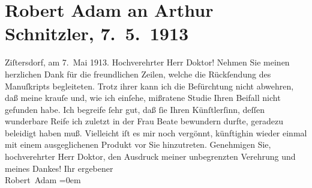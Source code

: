 

         \renewcommand{\erwaehnteOrte}{Orte: Wien, Zistersdorf}
         \renewcommand{\erwaehnteWerke}{Werke: Fatme, Frau Beate und ihr Sohn. Novelle}
               \section[Robert Adam an Arthur Schnitzler, 7. 5. 1913]{ Robert Adam an Arthur Schnitzler, 7. 5. 1913}\nopagebreak{}\rehead{ }\begin{ledgroupsized}[t]{13cm}\normalsize\beginnumbering \toendnotes[C]{\smallbreak\pagebreak[2]} 
\toendnotes[C]{\smallbreak}\pstart
           \raggedleft{}{\pb}Ziſtersdorf, am 7. Mai 1913.
                    \pend
           \pstart{}Hochverehrter Herr Doktor!\pend\pstart
           Nehmen Sie meinen herzlichen Dank für die freundlichen Zeilen, welche die
                    Rückſendung des Manuſkripts
                    begleiteten.\pend
           \pstart
           Trotz ihrer kann ich die Befürchtung nicht abwehren, daß meine krauſe und, wie
                    ich einſehe, mißratene Studie Ihren Beifall nicht gefunden habe. Ich begreife
                    ſehr gut, daß ſie Ihren Künſtlerſinn, deſſen wunderbare Reife ich zuletzt in der
                        Frau Beate bewundern durfte, geradezu
                    beleidigt haben muß.\pend
           \pstart
           Vielleicht iſt es mir noch vergönnt, künftighin wieder einmal mit einem
                    ausgeglichenen Produkt vor Sie hinzutreten.\pend
           \pstart
           Genehmigen Sie, hochverehrter Herr {\pb}Doktor, den Ausdruck
                    meiner unbegrenzten Verehrung und meines Dankes!\pend
           \pstart
           Ihr ergebener{\\[\baselineskip]}\spacefill\mbox{Robert Adam}\pend
           \leftskip=0em{}
         
         \endnumbering{}\end{ledgroupsized}  \newcommand{\dateiname}{L02136}\newcommand{\titel}{Robert Adam an Arthur Schnitzler, 7. 5. 1913}\newcommand{\editorInnen}{Martin Anton Müller und Gerd-Hermann Susen}
      